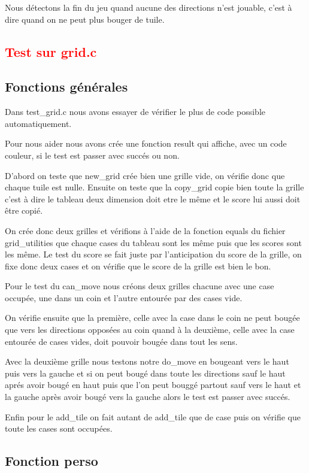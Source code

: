 \documentclass{article}
\begin{document}
Nous détectons la fin du jeu quand aucune des directions n'est jouable, c'est à dire quand on ne peut plus bouger de tuile.

\textcolor{red}{\section{Test sur grid.c}}

  \subsection{Fonctions générales}
  Dans test\_grid.c nous avons essayer de vérifier le plus de code possible automatiquement.
  
  Pour nous aider nous avons crée une fonction result qui affiche, avec un code couleur, si le test est passer avec succés ou non.
  
  D'abord on teste que new\_grid crée bien une grille vide, on vérifie donc que chaque tuile est nulle.
  Ensuite on teste que la copy\_grid copie bien toute la grille c'est à dire le tableau deux dimension doit etre le même et le score lui aussi doit être copié.

  On crée donc deux grilles et vérifions à l'aide de la fonction equals du fichier grid\_utilities que chaque cases du tableau sont les même puis que les scores sont les même.
  Le test du score se fait juste par l'anticipation du score de la grille, on fixe donc deux cases et on vérifie que le score de la grille est bien le bon.

  Pour le test du can\_move nous créons deux grilles chacune avec une case occupée, une dans un coin et l'autre entourée par des cases vide.

  On vérifie ensuite que la première, celle avec la case dans le coin ne peut bougée que vers les directions opposées au coin quand à la deuxième, celle avec la case entourée de cases vides, doit pouvoir bougée dans tout les sens.
  
  Avec la deuxième grille nous testons notre do\_move en bougeant vers le haut puis vers la gauche et si on peut bougé dans toute les directions sauf le haut aprés avoir bougé en haut puis que l'on peut bouggé partout sauf vers le haut et la gauche après avoir bougé vers la gauche alors le test est passer avec succés.

  Enfin pour le add\_tile on fait autant de add\_tile que de case puis on vérifie que toute les cases sont occupées.
  
  \subsection{Fonction perso}
  
\end{document}
